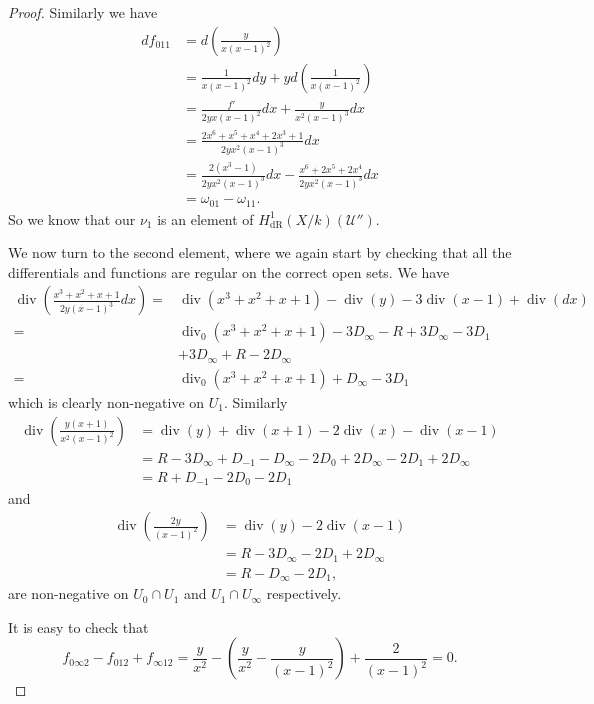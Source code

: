 \documentclass[draft, 11pt]{article} %
\theoremstyle{plain}
\theoremstyle{remark}
\newcommand{\cU}{{\mathcal U}}
\newcommand{\derhamhone}{H_{\text {dR}}^1(X/k)}
\DeclareMathOperator{\di}{div}
\begin{document}
\begin{proof}
Similarly we have
\begin{align*}
df_{0 1 1} & = d \left( \frac{y}{x(x-1)^2} \right) \\
& = \frac{1}{x(x-1)^2}dy + y d \left( \frac{1}{x(x-1)^2} \right) \\
& = \frac{f'}{2yx(x-1)^2}dx + \frac{y}{x^2(x-1)^3}dx \\
& = \frac{2x^6 + x^5 + x^4 + 2x^3 + 1}{2yx^2(x-1)^3} dx\\
& = \frac{2(x^3-1)}{2yx^2(x-1)^3}dx - \frac{x^6 + 2x^5 + 2x^4}{2yx^2(x-1)^3}dx \\
& = \omega_{01} - \omega_{11}.
\end{align*}
So we know that our $\nu_1$ is an element of $\derhamhone (\cU'')$.

We now turn to the second element, where we again start by checking that all the differentials and functions are regular on the correct open sets.
We have
\begin{align*}
\di \left( \frac{x^3 + x^2 + x + 1}{2y(x-1)^3} dx \right) = & \di(x^3+x^2+x+1) -\di(y) - 3\di(x-1) + \di(dx) \\
= & \di_0(x^3 + x^2 + x + 1) - 3D_\infty - R + 3D_\infty - 3D_1 \\
& + 3D_\infty + R - 2D_\infty \\
 = &  \di_0(x^3 + x^2 + x + 1) + D_\infty - 3D_1
\end{align*}
which is clearly non-negative on $U_1$.
Similarly
\begin{align*}
\di \left( \frac{y(x+1)}{x^2(x-1)^2} \right) & = \di(y) + \di(x+1) - 2\di(x) - \di(x-1) \\
& = R - 3D_\infty + D_{-1} -D_\infty -2D_0 + 2D_\infty - 2D_1 + 2D_\infty \\
& = R + D_{-1} - 2D_0 - 2D_1
\end{align*}
and
\begin{align*}
\di \left( \frac{2y}{(x-1)^2} \right) & = \di(y) - 2\di(x-1) \\
& = R - 3D_\infty - 2D_1 + 2D_\infty \\
& = R - D_\infty - 2D_1,
\end{align*}
are non-negative on $U_0 \cap U_1$ and $U_1 \cap U_\infty$ respectively.

It is easy to check that
\[
f_{0 \infty 2} - f_{0 1 2 } + f_{\infty 1 2} = \frac{y}{x^2} - \left( \frac{y}{x^2} - \frac{y}{(x-1)^2} \right) + \frac{2}{(x-1)^2} = 0.
\]


\end{proof}
\end{document}
